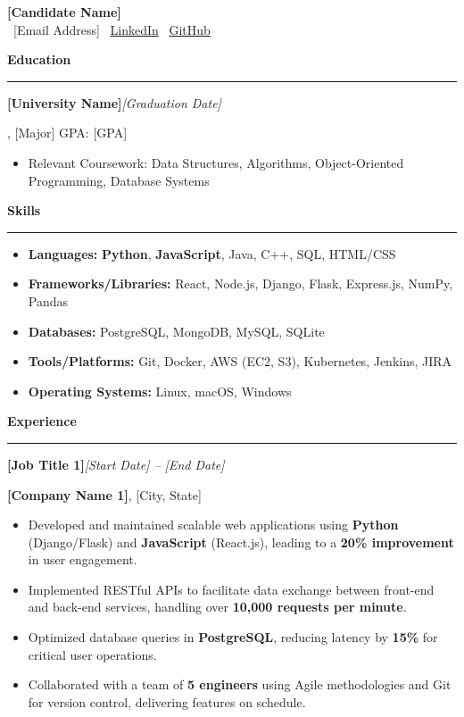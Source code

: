 \documentclass{article}
\newcommand{\resheading}[1]{%
  \vspace{6pt}\noindent\textbf{\Large #1}%
  \par\vspace{3pt}\hrule\vspace{3pt}%
}
\newcommand{\ressubheading}[2]{%
  \vspace{4pt}\noindent\textbf{#1}\hfill\textit{#2}%
  \par\vspace{2pt}%
}
\begin{document}
\begin{center}
    \textbf{\Huge [Candidate Name]} \\
    [Phone Number] \textperiodcentered\ [Email Address] \textperiodcentered\ \href{[LinkedIn URL]}{LinkedIn} \textperiodcentered\ \href{[GitHub URL]}{GitHub}
\end{center}
\vspace{-10pt} %

\resheading{Education}
\ressubheading{[University Name]}{[Graduation Date]}
\noindent [Degree], [Major] \hfill GPA: [GPA]
\begin{itemize}[nosep]
    \item Relevant Coursework: Data Structures, Algorithms, Object-Oriented Programming, Database Systems
\end{itemize}

\resheading{Skills}
\begin{itemize}[nosep, itemsep=0pt]
    \item \textbf{Languages:} \textbf{Python}, \textbf{JavaScript}, Java, C++, SQL, HTML/CSS
    \item \textbf{Frameworks/Libraries:} React, Node.js, Django, Flask, Express.js, NumPy, Pandas
    \item \textbf{Databases:} PostgreSQL, MongoDB, MySQL, SQLite
    \item \textbf{Tools/Platforms:} Git, Docker, AWS (EC2, S3), Kubernetes, Jenkins, JIRA
    \item \textbf{Operating Systems:} Linux, macOS, Windows
\end{itemize}

\resheading{Experience}

\ressubheading{[Job Title 1]}{[Start Date] -- [End Date]}
\noindent \textbf{[Company Name 1]}, [City, State]
\begin{itemize}[nosep]
    \item Developed and maintained scalable web applications using \textbf{Python} (Django/Flask) and \textbf{JavaScript} (React.js), leading to a \textbf{20\% improvement} in user engagement.
    \item Implemented RESTful APIs to facilitate data exchange between front-end and back-end services, handling over \textbf{10,000 requests per minute}.
    \item Optimized database queries in \textbf{PostgreSQL}, reducing latency by \textbf{15\%} for critical user operations.
    \item Collaborated with a team of \textbf{5 engineers} using Agile methodologies and Git for version control, delivering features on schedule.
\end{itemize}
\end{document}

